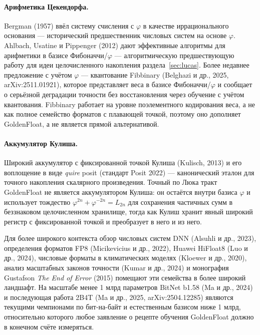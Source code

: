 \documentclass[11pt,a4paper]{article}
\theoremstyle{plain}
\begin{document}
\paragraph{Арифметика Цекендорфа.}
Bergman (1957) ввёл систему счисления с \(\varphi\) в качестве иррационального
основания --- исторический предшественник числовых систем на основе \(\varphi\).
Ahlbach, Usatine и Pippenger (2012) дают эффективные алгоритмы для арифметики в
базисе Фибоначчи/\(\varphi\) --- алгоритмическую предшествующую работу для идеи
целочисленного накопления раздела~\ref{sec:lucas}.
Более недавнее предложение с учётом \(\varphi\) --- квантование Fibbinary
(Belghazi и др., 2025, arXiv:2511.01921), которое представляет веса в базисе
Фибоначчи/\(\varphi\) и сообщает о серьёзной деградации точности без
восстановления через обучение с учётом квантования. Fibbinary работает на уровне
поэлементного кодирования веса, а не как полное семейство форматов с плавающей
точкой, поэтому оно дополняет GoldenFloat, а не является прямой альтернативой.

\paragraph{Аккумулятор Кулиша.}
Широкий аккумулятор с фиксированной точкой Кулиша (Kulisch, 2013) и его
воплощение в виде \emph{quire} posit (стандарт Posit 2022) --- канонический
эталон для точного накопления скалярного произведения. Точный по Люка тракт
GoldenFloat не является аккумулятором Кулиша: он остаётся внутри базиса
\(\varphi\) и использует тождество \(\varphi^{2n} + \varphi^{-2n} = L_{2n}\) для
сохранения частичных сумм в беззнаковом целочисленном хранилище, тогда как Кулиш
хранит явный широкий регистр с фиксированной точкой и преобразует в него и из него.

Для более широкого контекста обзор числовых систем DNN (Alsuhli и др., 2023),
определения форматов FP8 (Micikevicius и др., 2022), Huawei HiFloat8
(Luo и др., 2024), числовые форматы в климатических моделях (Kloewer и др., 2020),
анализ масштабных законов точности (Kumar и др., 2024) и монография Gustafson
\emph{The End of Error} (2015) помещают эти семейства в более широкий ландшафт.
На масштабе менее 1 млрд параметров BitNet b1.58 (Ma и др., 2024) и
последующая работа 2B4T (Ma и др., 2025, arXiv:2504.12285) являются текущими
чемпионами по бит-на-байт и естественным базисом ниже 1 млрд, относительно
которого любое заявление о рецепте обучения GoldenFloat должно в конечном счёте
измеряться.
\end{document}
